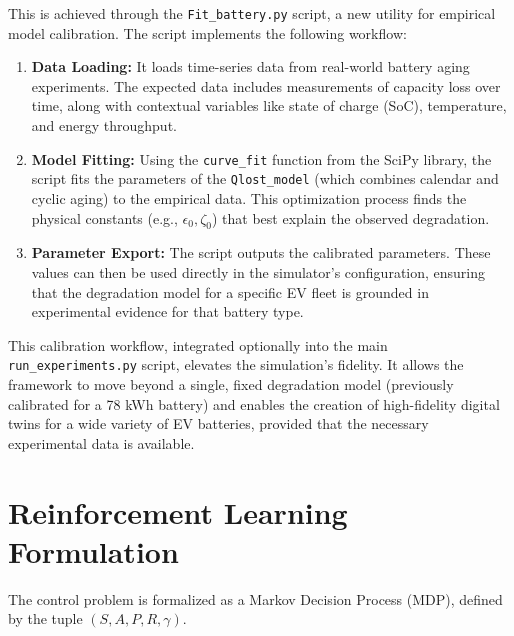 This is achieved through the \texttt{Fit\_battery.py} script, a new utility for empirical model calibration. The script implements the following workflow:
\begin{enumerate}
    \item \textbf{Data Loading:} It loads time-series data from real-world battery aging experiments. The expected data includes measurements of capacity loss over time, along with contextual variables like state of charge (SoC), temperature, and energy throughput.
    \item \textbf{Model Fitting:} Using the \texttt{curve\_fit} function from the SciPy library, the script fits the parameters of the \texttt{Qlost\_model} (which combines calendar and cyclic aging) to the empirical data. This optimization process finds the physical constants (e.g., $\epsilon_0, \zeta_0$) that best explain the observed degradation.
    \item \textbf{Parameter Export:} The script outputs the calibrated parameters. These values can then be used directly in the simulator's configuration, ensuring that the degradation model for a specific EV fleet is grounded in experimental evidence for that battery type.
\end{enumerate}
This calibration workflow, integrated optionally into the main \texttt{run\_experiments.py} script, elevates the simulation's fidelity. It allows the framework to move beyond a single, fixed degradation model (previously calibrated for a 78 kWh battery) and enables the creation of high-fidelity digital twins for a wide variety of EV batteries, provided that the necessary experimental data is available.

\section{Reinforcement Learning Formulation}
The control problem is formalized as a Markov Decision Process (MDP), defined by the tuple $(S, A, P, R, \gamma)$.

